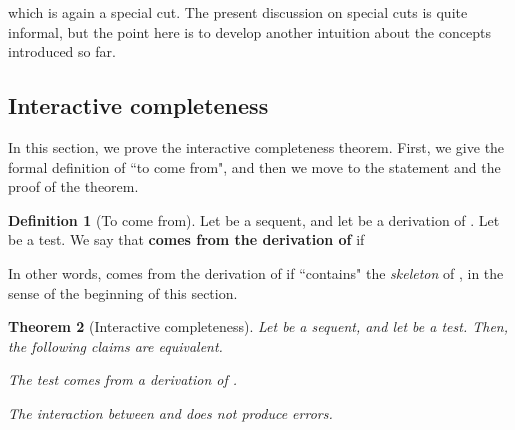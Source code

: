 \documentclass[copyright,creativecommons]{eptcs}
\newtheorem{theorem}{Theorem}[section]   \newtheorem{lemma}[theorem]{Lemma}
\theoremstyle{definition}
\newtheorem{Definition}[theorem]{Definition}
\newcommand{\squishlist}{
 \begin{list}{}
  { \setlength{\itemsep}{0pt}
     \setlength{\parsep}{3pt}
     \setlength{\topsep}{3pt}
     \setlength{\partopsep}{0pt}
     \setlength{\leftmargin}{1em}
     \setlength{\labelwidth}{1.5em}
     \setlength{\labelsep}{0.5em} } }
\newcommand{\squishend}{
  \end{list}  }
\begin{document}
\vspace{0.25cm}

\noindent which is again a
special cut.
The present discussion on special cuts is quite
informal, but the  point here is to develop
another intuition about the  concepts  introduced so far.


\subsection{Interactive completeness} \label{compsec}
In this section, we prove the interactive completeness theorem. First,
we give the formal definition of ``to come from",
and then we move to the statement and the proof of the theorem.





 \begin{Definition}[To come from] \label{interpretation} Let  be a sequent, and let  be a derivation of .
Let  be a test. We say that 
\textbf{comes from the derivation  of }
if \squishlist
\item[] 

\squishend


 \end{Definition}


In other words,  comes from the derivation  of  if  ``contains" the \emph{skeleton} of , in the  sense of the beginning of this section.

 \begin{theorem}[Interactive completeness]
 Let  \/\@ be a sequent, and let  \/\@ be a test.
 Then, the following claims are equivalent.
 \squishlist
 \item[ \emph{(1)}] The test \/\@ comes from a derivation  of  \/\@.
 \item[ \emph{(2)}] The interaction between \/\@ and  \/\@
 does not produce errors.
 \squishend
  \end{theorem}
\end{document}
